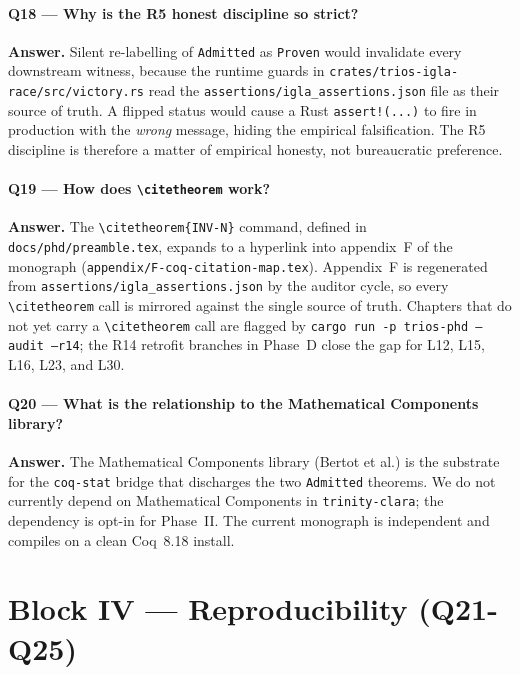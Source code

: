 \paragraph{Q18 — Why is the R5 honest discipline so strict?}

\textbf{Answer.} Silent re-labelling of \texttt{Admitted} as
\texttt{Proven} would invalidate every downstream witness, because the
runtime guards in \texttt{crates/trios-igla-race/src/victory.rs} read
the \texttt{assertions/igla\_assertions.json} file as their source of
truth. A flipped status would cause a Rust \texttt{assert!(...)} to fire
in production with the \emph{wrong} message, hiding the empirical
falsification. The R5 discipline is therefore a matter of empirical
honesty, not bureaucratic preference.

\paragraph{Q19 — How does \texttt{\textbackslash citetheorem} work?}

\textbf{Answer.} The \texttt{\textbackslash citetheorem\{INV-N\}}
command, defined in \texttt{docs/phd/preamble.tex}, expands to a
hyperlink into appendix~F of the monograph
(\texttt{appendix/F-coq-citation-map.tex}). Appendix~F is regenerated
from \texttt{assertions/igla\_assertions.json} by the auditor cycle, so
every \texttt{\textbackslash citetheorem} call is mirrored against the
single source of truth. Chapters that do not yet carry a
\texttt{\textbackslash citetheorem} call are flagged by
\texttt{cargo run -p trios-phd -- audit --r14}; the R14 retrofit branches
in Phase~D close the gap for L12, L15, L16, L23, and L30.

\paragraph{Q20 — What is the relationship to the Mathematical Components library?}

\textbf{Answer.} The Mathematical Components library (Bertot et al.) is
the substrate for the \texttt{coq-stat} bridge that discharges the two
\texttt{Admitted} theorems. We do not currently depend on
Mathematical Components in \texttt{trinity-clara}; the dependency is
opt-in for Phase~II. The current monograph is independent and compiles
on a clean Coq~8.18 install.

\section*{Block IV — Reproducibility (Q21-Q25)}

